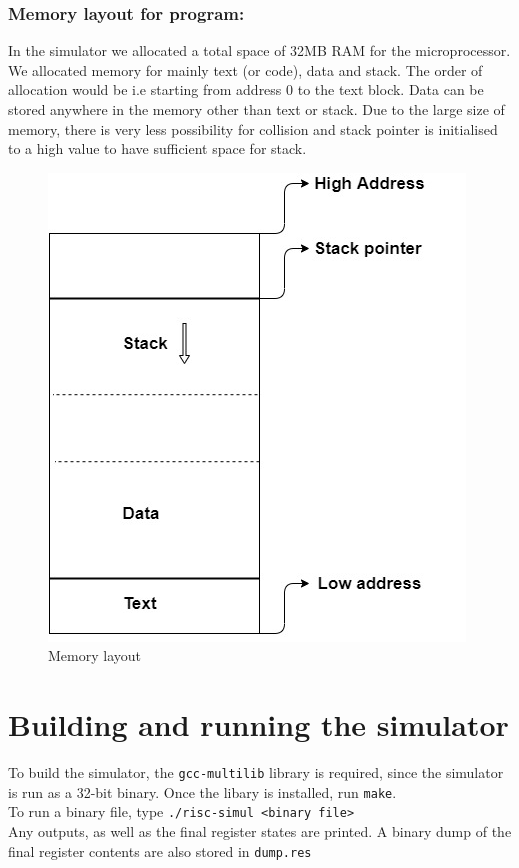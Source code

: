 \subsubsection{Memory layout for program:}
In the simulator we allocated a total space of 32MB RAM for the microprocessor. We allocated memory for mainly text (or code), data and stack. The order of allocation would be i.e starting from address 0 to the text block. Data can be stored anywhere in the memory other than text or stack. Due to the large size of memory, there is very less possibility for collision and stack pointer is initialised to a high value to have sufficient space for stack.
\begin{figure}[H]
    \centering
    \includegraphics[scale=0.7]{figures/mem.jpg}
    \caption{Memory layout}
    \label{fig:Memory layout}
\end{figure}

\section{Building and running the simulator}
\newline To build the simulator, the \texttt{gcc-multilib} library is required, since the simulator is run as a 32-bit binary. Once the libary is installed, run \texttt{make}.\\
To run a binary file, type \texttt{./risc-simul <binary file>}\\
Any outputs, as well as the final register states are printed. A binary dump of the final register contents are also stored in \texttt{dump.res}
\newpage
